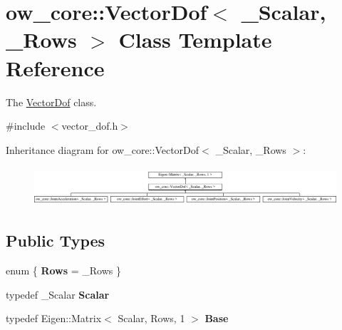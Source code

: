 \hypertarget{classow__core_1_1VectorDof}{}\section{ow\+\_\+core\+:\+:Vector\+Dof$<$ \+\_\+\+Scalar, \+\_\+\+Rows $>$ Class Template Reference}
\label{classow__core_1_1VectorDof}


The \hyperlink{classow__core_1_1VectorDof}{Vector\+Dof} class.  




{\ttfamily \#include $<$vector\+\_\+dof.\+h$>$}

Inheritance diagram for ow\+\_\+core\+:\+:Vector\+Dof$<$ \+\_\+\+Scalar, \+\_\+\+Rows $>$\+:\begin{figure}[H]
\begin{center}
\leavevmode
\includegraphics[height=1.458333cm]{d9/d10/classow__core_1_1VectorDof}
\end{center}
\end{figure}
\subsection*{Public Types}
\begin{DoxyCompactItemize}
\item 
enum \{ {\bfseries Rows} = \+\_\+\+Rows
 \}\hypertarget{classow__core_1_1VectorDof_a7c5a7ddd6224d55ca6c638399a160a17}{}\label{classow__core_1_1VectorDof_a7c5a7ddd6224d55ca6c638399a160a17}

\item 
typedef \+\_\+\+Scalar {\bfseries Scalar}\hypertarget{classow__core_1_1VectorDof_acf92659e64b4ee228fbf3ae573680655}{}\label{classow__core_1_1VectorDof_acf92659e64b4ee228fbf3ae573680655}

\item 
typedef Eigen\+::\+Matrix$<$ Scalar, Rows, 1 $>$ {\bfseries Base}\hypertarget{classow__core_1_1VectorDof_a797da821d2fab9e447eab836718293ef}{}\label{classow__core_1_1VectorDof_a797da821d2fab9e447eab836718293ef}

\end{DoxyCompactItemize}
